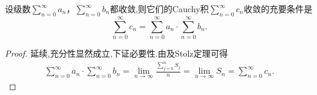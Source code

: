 \documentclass[../../main.tex]{subfiles}%
\begin{document}
\begin{corollary}\label{corollary:收敛级数Cauchy积收敛则就等于级数积}
设级数\(\sum_{n = 0}^{\infty} a_n\)，\(\sum_{n = 0}^{\infty} b_n\)都收敛,则它们的Cauchy积\(\sum_{n = 0}^{\infty} c_n\)收敛的充要条件是
\[
\sum_{n = 0}^{\infty} c_n = \sum_{n = 0}^{\infty} a_n \cdot \sum_{n = 0}^{\infty} b_n. 
\]
\end{corollary}
\begin{proof}
延续,充分性显然成立,下证必要性.由及Stolz定理可得
\begin{align*}
\sum_{n=0}^{\infty}{a_n}\cdot \sum_{n=0}^{\infty}{b_n}=\lim_{n\rightarrow \infty} \frac{\sum\limits_{j=0}^n{S_j}}{n}=\lim_{n\rightarrow \infty} S_n=\sum_{n=0}^{\infty}{c_n}.
\end{align*}
\end{proof}
\end{document}
